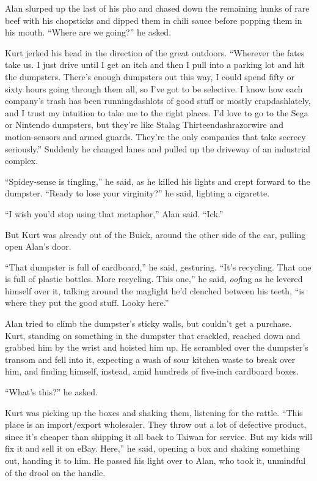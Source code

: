 Alan slurped up the last of his pho and chased down the remaining
hunks of rare beef with his chopsticks and dipped them in chili sauce
before popping them in his mouth.  ``Where are we going?'' he asked.

Kurt jerked his head in the direction of the great outdoors. 
``Wherever the fates take us.  I just drive until I get an itch and
then I pull into a parking lot and hit the dumpsters.  There's enough
dumpsters out this way, I could spend fifty or sixty hours going
through them all, so I've got to be selective.  I know how each
company's trash has been runningdash{}lots of good stuff or mostly
crapdash{}lately, and I trust my intuition to take me to the right
places.  I'd love to go to the Sega or Nintendo dumpsters, but they're
like Stalag Thirteendash{}razorwire and motion-sensors and armed guards. 
They're the only companies that take secrecy seriously.'' Suddenly he
changed lanes and pulled up the driveway of an industrial complex.

``Spidey-sense is tingling,'' he said, as he killed his lights and
crept forward to the dumpster.  ``Ready to lose your virginity?'' he
said, lighting a cigarette.

``I wish you'd stop using that metaphor,'' Alan said.  ``Ick.''

But Kurt was already out of the Buick, around the other side of the
car, pulling open Alan's door.

``That dumpster is full of cardboard,'' he said, gesturing.  ``It's
recycling.  That one is full of plastic bottles.  More recycling. 
This one,'' he said, \textit{oof}ing as he levered himself over it,
talking around the maglight he'd clenched between his teeth, ``is
where they put the good stuff.  Looky here.''

Alan tried to climb the dumpster's sticky walls, but couldn't get a
purchase.  Kurt, standing on something in the dumpster that crackled,
reached down and grabbed him by the wrist and hoisted him up.  He
scrambled over the dumpster's transom and fell into it, expecting a
wash of sour kitchen waste to break over him, and finding himself,
instead, amid hundreds of five-inch cardboard boxes.

``What's this?'' he asked.

Kurt was picking up the boxes and shaking them, listening for the
rattle.  ``This place is an import/export wholesaler.  They throw out
a lot of defective product, since it's cheaper than shipping it all
back to Taiwan for service.  But my kids will fix it and sell it on
eBay.  Here,'' he said, opening a box and shaking something out,
handing it to him.  He passed his light over to Alan, who took it,
unmindful of the drool on the handle.

